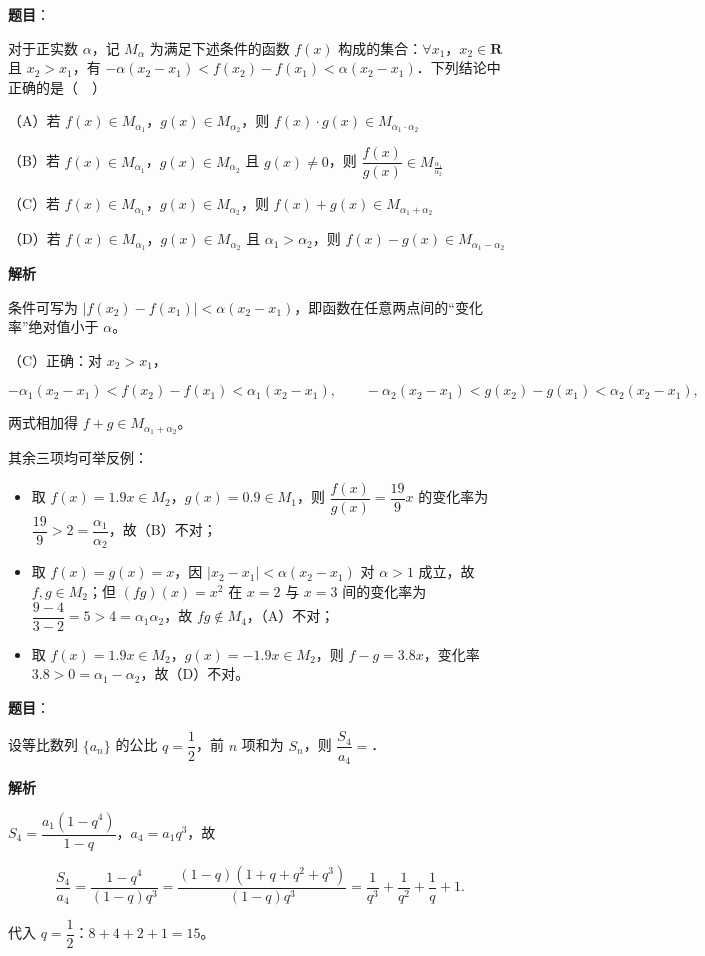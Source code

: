 \begin{answer}

\textbf{题目}：

对于正实数 $\alpha$，记 $M_\alpha$ 为满足下述条件的函数 $f(x)$ 构成的集合：$\forall x_1$，$x_2\in\mathbf R$ 且 $x_2>x_1$，有 $-\alpha(x_2-x_1)<f(x_2)-f(x_1)<\alpha(x_2-x_1)$．下列结论中正确的是（　）

（A）若 $f(x)\in M_{\alpha_1}$，$g(x)\in M_{\alpha_2}$，则 $f(x)\cdot g(x)\in M_{\alpha_1\cdot\alpha_2}$

（B）若 $f(x)\in M_{\alpha_1}$，$g(x)\in M_{\alpha_2}$ 且 $g(x)\neq0$，则 $\dfrac{f(x)}{g(x)}\in M_{\frac{\alpha_1}{\alpha_2}}$

（C）若 $f(x)\in M_{\alpha_1}$，$g(x)\in M_{\alpha_2}$，则 $f(x)+g(x)\in M_{\alpha_1+\alpha_2}$

（D）若 $f(x)\in M_{\alpha_1}$，$g(x)\in M_{\alpha_2}$ 且 $\alpha_1>\alpha_2$，则 $f(x)-g(x)\in M_{\alpha_1-\alpha_2}$

\textbf{解析}

条件可写为 $|f(x_2)-f(x_1)|<\alpha(x_2-x_1)$，即函数在任意两点间的“变化率”绝对值小于 $\alpha$。

（C）正确：对 $x_2>x_1$，

\nopagebreak[4]
\[-\alpha_1(x_2-x_1)<f(x_2)-f(x_1)<\alpha_1(x_2-x_1),\qquad
-\alpha_2(x_2-x_1)<g(x_2)-g(x_1)<\alpha_2(x_2-x_1),\]

两式相加得 $f+g\in M_{\alpha_1+\alpha_2}$。

其余三项均可举反例：

\begin{itemize}
\item 取 $f(x)=1.9x\in M_2$，$g(x)=0.9\in M_1$，则 $\dfrac{f(x)}{g(x)}=\dfrac{19}{9}x$ 的变化率为 $\dfrac{19}{9}>2=\dfrac{\alpha_1}{\alpha_2}$，故（B）不对；
\item 取 $f(x)=g(x)=x$，因 $|x_2-x_1|<\alpha(x_2-x_1)$ 对 $\alpha>1$ 成立，故 $f,g\in M_2$；但 $(fg)(x)=x^2$ 在 $x=2$ 与 $x=3$ 间的变化率为 $\dfrac{9-4}{3-2}=5>4=\alpha_1\alpha_2$，故 $fg\notin M_4$，（A）不对；
\item 取 $f(x)=1.9x\in M_2$，$g(x)=-1.9x\in M_2$，则 $f-g=3.8x$，变化率 $3.8>0=\alpha_1-\alpha_2$，故（D）不对。
\end{itemize}


\end{answer}
\begin{answer}

\textbf{题目}：

设等比数列 $\{a_n\}$ 的公比 $q=\dfrac12$，前 $n$ 项和为 $S_n$，则 $\dfrac{S_4}{a_4}=$\gkblank{}．

\textbf{解析}

$S_4=\dfrac{a_1(1-q^4)}{1-q}$，$a_4=a_1q^3$，故

\nopagebreak[4]
\[\frac{S_4}{a_4}=\frac{1-q^4}{(1-q)q^3}=\frac{(1-q)(1+q+q^2+q^3)}{(1-q)q^3}=\frac1{q^3}+\frac1{q^2}+\frac1q+1.\]

代入 $q=\dfrac12$：$8+4+2+1=15$。


\end{answer}
